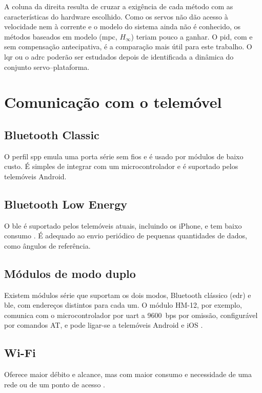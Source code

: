 A coluna da direita resulta de cruzar a exigência de cada método com as características do hardware escolhido. Como os servos não dão acesso à velocidade nem à corrente e o modelo do sistema ainda não é conhecido, os métodos baseados em modelo (\gls{mpc}, $H_\infty$) teriam pouco a ganhar. O \gls{pid}, com e sem compensação antecipativa, é a comparação mais útil para este trabalho. O \gls{lqr} ou o \gls{adrc} poderão ser estudados depois de identificada a dinâmica do conjunto servo--plataforma.

\section{Comunicação com o telemóvel}

\subsection{Bluetooth Classic}
O perfil \gls{spp} emula uma porta série sem fios e é usado por módulos de baixo custo. É simples de integrar com um microcontrolador e é suportado pelos telemóveis Android.

\subsection{Bluetooth Low Energy}
O \gls{ble} é suportado pelos telemóveis atuais, incluindo os iPhone, e tem baixo consumo \cite{esp32}. É adequado ao envio periódico de pequenas quantidades de dados, como ângulos de referência.

\subsection{Módulos de modo duplo}
Existem módulos série que suportam os dois modos, Bluetooth clássico (\gls{edr}) e \gls{ble}, com endereços distintos para cada um. O módulo HM-12, por exemplo, comunica com o microcontrolador por \gls{uart} a 9600~bps por omissão, configurável por comandos AT, e pode ligar-se a telemóveis Android e iOS \cite{hm12}.

\subsection{Wi-Fi}
Oferece maior débito e alcance, mas com maior consumo e necessidade de uma rede ou de um ponto de acesso \cite{esp32s3ds}.

